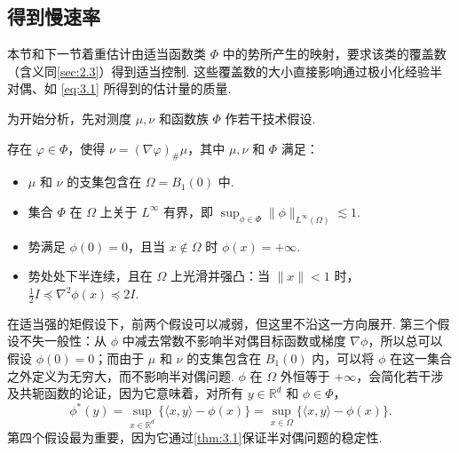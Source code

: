 \subsection{得到慢速率}\label{sec:3.4}
本节和下一节着重估计由适当函数类 $\Phi$ 中的势所产生的映射，要求该类的覆盖数（含义同\autoref{sec:2.3}）得到适当控制. 这些覆盖数的大小直接影响通过极小化经验半对偶、如 \eqref{eq:3.1} 所得到的估计量的质量.

为开始分析，先对测度 $\mu,\nu$ 和函数族 $\Phi$ 作若干技术假设.
\begin{assumption}\label{assump:3.3}
存在 $\varphi\in\Phi$，使得 $\nu=(\nabla\varphi)_\#\mu$，其中 $\mu,\nu$ 和 $\Phi$ 满足：
\begin{itemize}
\item $\mu$ 和 $\nu$ 的支集包含在 $\Omega=B_1(0)$ 中.
\item 集合 $\Phi$ 在 $\Omega$ 上关于 $L^\infty$ 有界，即 $\sup_{\phi\in\Phi}\|\phi\|_{L^\infty(\Omega)}\lesssim1$.
\item 势满足 $\phi(0)=0$，且当 $x\notin\Omega$ 时 $\phi(x)=+\infty$.
\item 势处处下半连续，且在 $\Omega$ 上光滑并强凸：当 $\|x\|<1$ 时，$\frac12 I\preceq\nabla^2\phi(x)\preceq2I$.
\end{itemize}
\end{assumption}
在适当强的矩假设下，前两个假设可以减弱，但这里不沿这一方向展开. 第三个假设不失一般性：从 $\phi$ 中减去常数不影响半对偶目标函数或梯度 $\nabla\phi$，所以总可以假设 $\phi(0)=0$；而由于 $\mu$ 和 $\nu$ 的支集包含在 $B_1(0)$ 内，可以将 $\phi$ 在这一集合之外定义为无穷大，而不影响半对偶问题. $\phi$ 在 $\Omega$ 外恒等于 $+\infty$，会简化若干涉及共轭函数的论证，因为它意味着，对所有 $y\in\mathbb R^d$ 和 $\phi\in\Phi$，
$$\phi^*(y)=\sup_{x\in\mathbb R^d}\{\langle x,y\rangle-\phi(x)\}
=\sup_{x\in\Omega}\{\langle x,y\rangle-\phi(x)\}.$$
第四个假设最为重要，因为它通过\autoref{thm:3.1}保证半对偶问题的稳定性.

